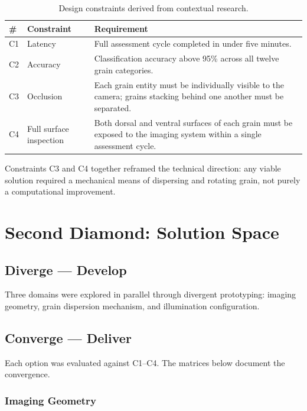 \begin{table}[H]
\centering
\caption{Design constraints derived from contextual research.}
\label{tab:design_constraints}
\begin{tabular}{p{0.5cm} p{3.5cm} p{8cm}}
\toprule
\textbf{\#} & \textbf{Constraint} & \textbf{Requirement} \\
\midrule
C1 & Latency            & Full assessment cycle completed in under five minutes. \\
C2 & Accuracy           & Classification accuracy above 95\% across all twelve grain categories. \\
C3 & Occlusion          & Each grain entity must be individually visible to the camera; grains stacking behind one another must be separated. \\
C4 & Full surface inspection & Both dorsal and ventral surfaces of each grain must be exposed to the imaging system within a single assessment cycle. \\
\bottomrule
\end{tabular}
\end{table}

Constraints C3 and C4 together reframed the technical direction: any viable solution required a mechanical means of dispersing and rotating grain, not purely a computational improvement.

\section{Second Diamond: Solution Space}

\subsection{Diverge — Develop}

Three domains were explored in parallel through divergent prototyping: imaging geometry, grain dispersion mechanism, and illumination configuration.

\subsection{Converge — Deliver}

Each option was evaluated against C1--C4. The matrices below document the convergence.

\subsubsection{Imaging Geometry}

